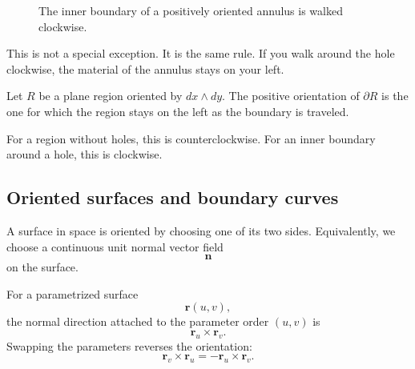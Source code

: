 \begin{figure}[h]
\centering
{}
\caption{The inner boundary of a positively oriented annulus is walked clockwise.}
\end{figure}

This is not a special exception.  It is the same rule.  If you walk around the hole
clockwise, the material of the annulus stays on your left.

\begin{definition}
Let \(R\) be a plane region oriented by \(dx\wedge dy\).  The positive orientation of
\(\partial R\) is the one for which the region stays on the left as the boundary is
traveled.

For a region without holes, this is counterclockwise.  For an inner boundary around a
hole, this is clockwise.
\end{definition}

\subsection{Oriented surfaces and boundary curves}

A surface in space is oriented by choosing one of its two sides.  Equivalently, we choose
a continuous unit normal vector field
\[
    \mathbf n
\]
on the surface.

For a parametrized surface
\[
    \mathbf r(u,v),
\]
the normal direction attached to the parameter order \((u,v)\) is
\[
    \mathbf r_u\times \mathbf r_v.
\]
Swapping the parameters reverses the orientation:
\[
    \mathbf r_v\times \mathbf r_u
    =
    -\mathbf r_u\times \mathbf r_v.
\]

